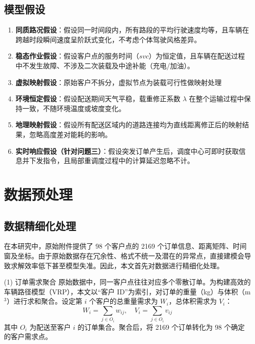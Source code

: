 \documentclass[12pt,a4paper]{article}
\begin{document}
\subsection{模型假设}
\begin{enumerate}
    \item \textbf{同质路况假设}：假设同一时间段内，所有路段的平均行驶速度均等，且车辆在跨越时段瞬间速度呈阶跃式变化，不考虑个体驾驶风格差异。
    
    \item \textbf{稳态作业假设}：假设客户点的服务时间（$svc$）为恒定值，且车辆在配送过程中不发生故障、不涉及二次装载及中途补能（充电/加油）。
    
    \item \textbf{虚拟映射假设}：原始客户不拆分，虚拟节点为装载可行性做映射处理
    
    \item \textbf{环境恒定假设}：假设配送期间天气平稳，载重修正系数 $\lambda$ 在整个运输过程中保持一致，不随环境温度或坡度变化。
    
    \item \textbf{地理映射假设}：假设所有配送区域内的道路连接均为直线距离修正后的映射结果，忽略高度差对能耗的影响。
    
    \item \textbf{实时响应假设（针对问题三）}：假设突发订单产生后，调度中心可即时获取信息并下发指令，且局部重调度过程中的计算延迟忽略不计。
\end{enumerate}

\section{数据预处理}
\subsection{数据精细化处理}
在本研究中，原始附件提供了 98 个客户点的 2169 个订单信息、距离矩阵、时间窗及坐标。由于原始数据存在冗余性、格式不统一及潜在的异常点，直接建模会导致求解效率低下甚至模型失准。因此，本文首先对数据进行精细化处理。

(1) 订单需求聚合  
原始数据中，同一客户点往往对应多个零散订单。为构建高效的车辆路径模型（VRP），本文以“客户 ID”为索引，对订单的重量（kg）与体积（m$^3$）进行求和聚合。设定第 $i$ 个客户的总重量需求为 $W_i$，总体积需求为 $V_i$：
\[
W_i = \sum_{j \in O_i} w_{ij}, \quad V_i = \sum_{j \in O_i} v_{ij}
\]
其中 $O_i$ 为配送至客户 $i$ 的订单集合。聚合后，将 2169 个订单转化为 98 个确定的客户需求点。
\end{document}
